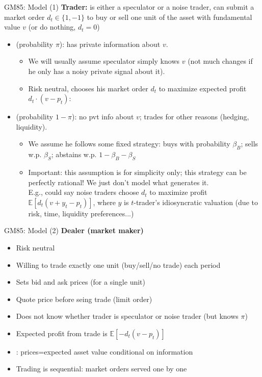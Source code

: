 \documentclass[english,10pt
,aspectratio=169
]{beamer}
\begin{document}
\begin{frame}{GM85: Model (1)}
	\textbf{Trader:} is either a speculator or a noise trader, can submit a market order $d_t \in \{1, -1\}$ to buy or sell one unit of the asset with fundamental value $v$ (or do nothing, $d_t=0$)
	\begin{itemize}
		\item {} (probability $\pi$): has private information about $v$.
		\begin{itemize}
			\item We will usually assume speculator simply knows $v$ (not much changes if he only has a noisy private signal about it).
			\item Risk neutral, chooses his market order $d_t$ to maximize expected profit $d_t \cdot (v-p_t)$:
		\end{itemize}
		\item {} (probability $1-\pi$): no pvt info about $v$; trades for other reasons (hedging, liquidity).
		\begin{itemize}
			\item We assume he follows some fixed strategy: buys with probability $\beta_B$; sells w.p. $\beta_S$; abstains w.p. $1-\beta_B - \beta_S$
			\item \alert{Important}: this assumption is for simplicity only; this strategy can be perfectly rational! We just don't model what generates it.
			\\E.g., could say noise traders choose $d_t$ to maximize profit $\mathbb{E}[d_t(v+y_t-p_t)]$, where $y$ is $t$-trader's idiosyncratic valuation (due to risk, time, liquidity preferences...)
		\end{itemize}
	\end{itemize}
\end{frame}


\begin{frame}{GM85: Model (2)}
	\textbf{Dealer (market maker)}
	\begin{itemize}
		\item Risk neutral
		\item Willing to trade \alert{exactly one unit} (buy/sell/no trade) each period
		\item Sets \alert{bid and ask prices} (for a single unit)
		\item Quote price before seing trade (limit order)
		\item Does not know whether trader is speculator or noise trader (but knows $\pi$)
		\item Expected profit from trade is $\mathbb{E}[-d_t(v-p_t)]$
		\item {}: prices=expected asset value conditional on information
		\item Trading is sequential: market orders served one by one
	\end{itemize}
\end{frame}
\end{document}
